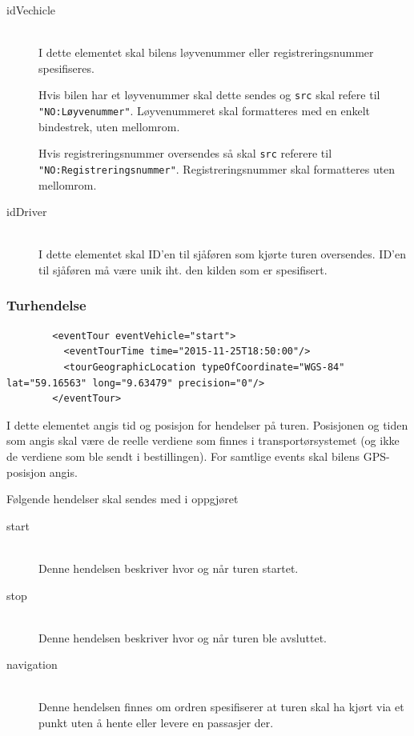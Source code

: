 \documentclass[a4paper,titlepage,norsk,11pt]{article}
\begin{document}
\begin{description}

	\item[idVechicle] \hfill \\
	I dette elementet skal bilens løyvenummer eller registreringsnummer spesifiseres.

	Hvis bilen har et løyvenummer skal dette sendes og \lstinline{src} skal refere til \lstinline{"NO:Løyvenummer"}. Løyvenummeret skal formatteres med en enkelt bindestrek, uten mellomrom.

	Hvis registreringsnummer oversendes så skal \lstinline{src} referere til \lstinline{"NO:Registreringsnummer"}. Registreringsnummer skal formatteres uten mellomrom.

	\item[idDriver] \hfill \\
	I dette elementet skal ID'en til sjåføren som kjørte turen oversendes. ID'en til sjåføren må være unik iht. den kilden som er spesifisert.

\end{description}

\subsubsection{Turhendelse}

\begin{lstlisting}
        <eventTour eventVehicle="start">
          <eventTourTime time="2015-11-25T18:50:00"/>
          <tourGeographicLocation typeOfCoordinate="WGS-84" lat="59.16563" long="9.63479" precision="0"/>
        </eventTour>
\end{lstlisting}

I dette elementet angis tid og posisjon for hendelser på turen. Posisjonen og tiden som angis skal være de reelle verdiene som finnes i transportørsystemet (og ikke de verdiene som ble sendt i bestillingen). For samtlige events skal bilens GPS-posisjon angis.

Følgende hendelser skal sendes med i oppgjøret

\begin{description}

  \item[start] \hfill \\
  Denne hendelsen beskriver hvor og når turen startet.

  \item[stop] \hfill \\
  Denne hendelsen beskriver hvor og når turen ble avsluttet.

	\item[navigation] \hfill \\
	Denne hendelsen finnes om ordren spesifiserer at turen skal ha kjørt via et punkt uten å hente eller levere en passasjer der.

\end{description}
\end{document}
